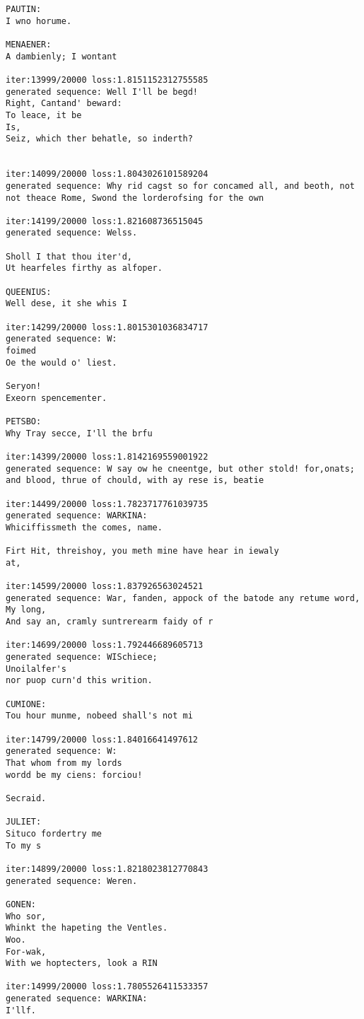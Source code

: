 \documentclass[11pt]{article}
\begin{document}
\begin{Verbatim}[commandchars=\\\{\}]
PAUTIN:
I wno horume.

MENAENER:
A dambienly; I wontant

iter:13999/20000 loss:1.8151152312755585
generated sequence: Well I'll be begd!
Right, Cantand' beward:
To leace, it be
Is,
Seiz, which ther behatle, so inderth?


iter:14099/20000 loss:1.8043026101589204
generated sequence: Why rid cagst so for concamed all, and beoth, not not theace Rome, Swond the lorderofsing for the own

iter:14199/20000 loss:1.821608736515045
generated sequence: Welss.

Sholl I that thou iter'd,
Ut hearfeles firthy as alfoper.

QUEENIUS:
Well dese, it she whis I

iter:14299/20000 loss:1.8015301036834717
generated sequence: W:
foimed
Oe the would o' liest.

Seryon!
Exeorn spencementer.

PETSBO:
Why Tray secce, I'll the brfu

iter:14399/20000 loss:1.8142169559001922
generated sequence: W say ow he cneentge, but other stold! for,onats; and blood, thrue of chould, with ay rese is, beatie

iter:14499/20000 loss:1.7823717761039735
generated sequence: WARKINA:
Whiciffissmeth the comes, name.

Firt Hit, threishoy, you meth mine have hear in iewaly
at, 

iter:14599/20000 loss:1.837926563024521
generated sequence: War, fanden, appock of the batode any retume word,
My long,
And say an, cramly suntrerearm faidy of r

iter:14699/20000 loss:1.792446689605713
generated sequence: WISchiece;
Unoilalfer's
nor puop curn'd this writion.

CUMIONE:
Tou hour munme, nobeed shall's not mi

iter:14799/20000 loss:1.84016641497612
generated sequence: W:
That whom from my lords
wordd be my ciens: forciou!

Secraid.

JULIET:
Situco fordertry me
To my s

iter:14899/20000 loss:1.8218023812770843
generated sequence: Weren.

GONEN:
Who sor,
Whinkt the hapeting the Ventles.
Woo.
For-wak,
With we hoptecters, look a RIN

iter:14999/20000 loss:1.7805526411533357
generated sequence: WARKINA:
I'llf.


\end{Verbatim}
\end{document}

